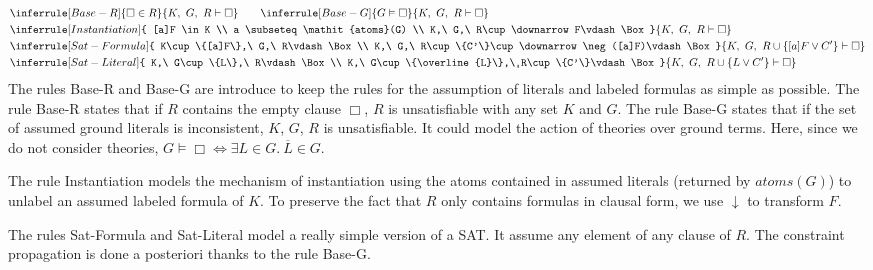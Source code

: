 \documentclass[a4paper,10pt]{article}
\newcommand{\atoms}{\mathit{atoms}}
\newcommand{\gen}{\vdash}
\begin{document}
\begin{eqnarray*}
&
\inferrule [Base-R]{
\Box\in R
}{
K,\ G,\ R\gen\Box
}\qquad
\inferrule [Base-G]{
G\vDash \Box
}{
K,\ G,\ R\gen\Box
}\\
&
\inferrule [Instantiation]{
[a]F \in K  \\ a \subseteq \atoms(G) \\ K,\ G,\ R\cup\downarrow F\gen\Box
}{
K,\ G,\ R\gen\Box
}\\
&
\inferrule [Sat-Formula]{
K\cup\{[a]F\},\ G,\ R\gen\Box\\ K,\ G,\ R\cup\{C'\}\cup \downarrow\neg([a]F)\gen\Box
}{
K,\ G,\ R\cup\{[a]F\vee C'\}\gen\Box
}\\
&
\inferrule [Sat-Literal]{
K,\ G\cup\{L\},\ R\gen\Box\\ K,\ G\cup\{\overline{L}\},\ R\cup\{C'\}\gen\Box
}{
K,\ G,\ R\cup\{L\vee C'\}\gen\Box
}
\end{eqnarray*}
The rules {\sc Base-R} and {\sc Base-G} are introduce to keep the rules for the assumption of
literals and labeled formulas as simple as possible. The rule {\sc Base-R} states that if $R$
contains the empty clause $\Box$, $R$ is unsatisfiable with any set $K$ and $G$. The rule {\sc Base-G}
states that if the set of assumed ground literals is inconsistent, $K$, $G$, $R$ is unsatisfiable.
It could model the action of theories over ground terms. Here, since we do not consider theories,
$G\vDash \Box\Leftrightarrow\exists L\in G.\ \overline L\in G$.

The rule {\sc Instantiation} models the mechanism of instantiation using the atoms contained in
assumed literals (returned by $\atoms(G)$) to unlabel an assumed labeled formula of $K$.
To preserve the fact that $R$ only contains formulas in clausal form, we use $\downarrow$
to transform $F$.

The rules {\sc Sat-Formula} and {\sc Sat-Literal} model a really simple version of a SAT. It assume
any element of any clause of $R$. The constraint propagation is done a posteriori thanks to the rule
{\sc Base-G}.
\end{document}
